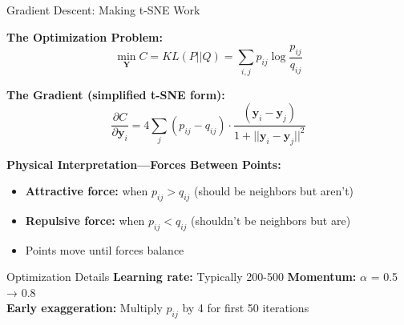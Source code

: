 \documentclass[10pt]{beamer}
\begin{document}
\begin{frame}{Gradient Descent: Making t-SNE Work}

\textbf{The Optimization Problem:}
\begin{equation}
\min_{\mathbf{Y}} C = KL(P||Q) = \sum_{i,j} p_{ij} \log \frac{p_{ij}}{q_{ij}}
\end{equation}

\vspace{0.1cm}
\textbf{The Gradient (simplified t-SNE form):}
\begin{equation}
\frac{\partial C}{\partial \mathbf{y}_i} = 4 \sum_j (p_{ij} - q_{ij}) \cdot \frac{(\mathbf{y}_i - \mathbf{y}_j)}{1 + ||\mathbf{y}_i - \mathbf{y}_j||^2}
\end{equation}

\vspace{0.1cm}
\textbf{Physical Interpretation—Forces Between Points:}
\begin{itemize}
    \setlength\itemsep{-0.1em}
    \item \textbf{Attractive force:} when $p_{ij} > q_{ij}$ (should be neighbors but aren't)
    \item \textbf{Repulsive force:} when $p_{ij} < q_{ij}$ (shouldn't be neighbors but are)
    \item Points move until forces balance
\end{itemize}

\vspace{0.05cm}
\begin{figure}
\centering
{}
\end{figure}

\vspace{0.05cm}
\begin{exampleblock}{Optimization Details}
\footnotesize
\textbf{Learning rate:} Typically 200-500 \quad \textbf{Momentum:} $\alpha$ = 0.5 → 0.8\\
\textbf{Early exaggeration:} Multiply $p_{ij}$ by 4 for first 50 iterations
\end{exampleblock}

\end{frame}
\end{document}
